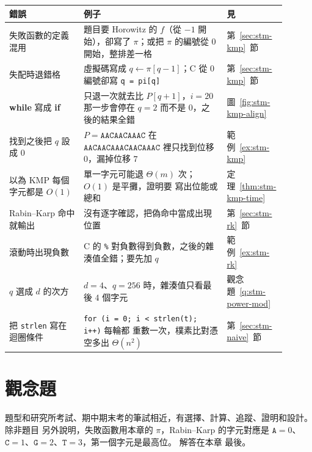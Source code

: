 \begin{center}
\small
\begin{tabular}{p{0.26\linewidth}p{0.50\linewidth}p{0.14\linewidth}}
\toprule
錯誤 & 例子 & 見 \\
\midrule
失敗函數的定義混用 & 題目要 Horowitz 的 $f$（從 $-1$ 開始），卻寫了 $\pi$；或把
$\pi$ 的編號從 $0$ 開始，整排差一格 & 第~\ref{sec:stm-kmp}~節 \\
失配時退錯格 & 虛擬碼寫成 $q \gets \pi[q - 1]$；C 從 $0$ 編號卻寫
\mbox{\texttt{q = pi[q]}} & 第~\ref{sec:stm-kmp}~節 \\
\textbf{while} 寫成 \textbf{if} & 只退一次就去比 $P[q + 1]$，$i = 20$ 那一步會停在
$q = 2$ 而不是 $0$，之後的結果全錯 & 圖~\ref{fig:stm-kmp-align} \\
找到之後把 $q$ 設成 $0$ & $P = \mathtt{AACAACAAAC}$ 在 $\mathtt{AACAACAAACAACAAAC}$
裡只找到位移 $0$，漏掉位移 $7$ & 範例~\ref{ex:stm-kmp} \\
以為 KMP 每個字元都是 $O(1)$ & 單一字元可能退 $\Theta(m)$ 次；$O(1)$ 是平攤，證明要
寫出位能或總和 & 定理~\ref{thm:stm-kmp-time} \\
Rabin--Karp 命中就輸出 & 沒有逐字確認，把偽命中當成出現位置 &
第~\ref{sec:stm-rk}~節 \\
滾動時出現負數 & C 的 \texttt{\%} 對負數得到負數，之後的雜湊值全錯；要先加 $q$ &
範例~\ref{ex:stm-rk} \\
$q$ 選成 $d$ 的次方 & $d = 4$、$q = 256$ 時，雜湊值只看最後 $4$ 個字元 &
觀念題~\ref{q:stm-power-mod} \\
把 \texttt{strlen} 寫在迴圈條件 & \texttt{for (i = 0; i < strlen(t); i++)} 每輪都
重數一次，樸素比對憑空多出 $\Theta(n^2)$ & 第~\ref{sec:stm-naive}~節 \\
\bottomrule
\end{tabular}
\end{center}

\section{觀念題}
\label{sec:stm-exercises}

題型和研究所考試、期中期末考的筆試相近，有選擇、計算、追蹤、證明和設計。 除非題目
另外說明，失敗函數用本章的 $\pi$，Rabin--Karp 的字元對應是 $\mathtt{A} = 0$、
$\mathtt{C} = 1$、$\mathtt{G} = 2$、$\mathtt{T} = 3$，第一個字元是最高位。 解答在本章
最後。

